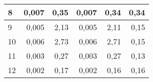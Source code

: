 {\begin{center}
\begin{tabular}{|l|r|r|r|r|r|}
8  & 0,007                                                & 0,35                                                   & 0,007                                               & 0,34                                                  & 0,34                                                  \\ \hline
9  & 0,005                                                & 2,13                                                   & 0,005                                               & 2,11                                                  & 0,15                                                  \\ \hline
10 & 0,006                                                & 2,73                                                   & 0,006                                               & 2,71                                                  & 0,15                                                  \\ \hline
11 & 0,003                                                & 0,27                                                   & 0,003                                               & 0,27                                                  & 0,13                                                  \\ \hline
12 & 0,002                                                & 0,17                                                   & 0,002                                               & 0,16                                                  & 0,16                                                  \\ \hline
\end{tabular}

    \end{center}
}